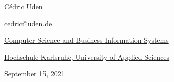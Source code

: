 \begin{center}
    

\vspace*{3mm}


\vspace*{10mm}

{\Large Cédric Uden}

\vspace*{2mm}

{\large\href{mailto:cedric@uden.de}{cedric@uden.de}}

\vspace*{6mm}

{\large\href{https://www.h-ka.de/en/about-hka/faculties/computer-science-and-business-information-systems/overview}{Computer Science and Business Information Systems}}

{\large\href{https://www.h-ka.de/en/}{Hochschule Karlsruhe, University of Applied Sciences}}

\vspace*{12mm}



\vspace*{12mm}

{\large September 15, 2021}

\vspace*{12mm}

\end{center}
